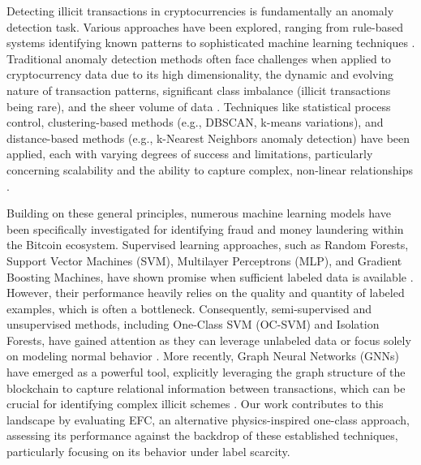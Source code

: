 \documentclass[12pt]{article}
\begin{document}
Detecting illicit transactions in cryptocurrencies is fundamentally an anomaly detection task. Various approaches have been 
explored, ranging from rule-based systems identifying known patterns to sophisticated machine learning techniques \cite{samariya2023comprehensive, li2023survey}.
Traditional anomaly detection methods often face challenges when applied to cryptocurrency data due to its high dimensionality,
the dynamic and evolving nature of transaction patterns, significant class imbalance (illicit transactions being rare), and
the sheer volume of data \cite{pallathadka2022cryptocurrency}. Techniques like statistical process control,
clustering-based methods (e.g., DBSCAN, k-means variations), and distance-based methods (e.g., k-Nearest Neighbors anomaly detection)
have been applied, each with varying degrees of success and limitations, particularly concerning scalability and the ability
to capture complex, non-linear relationships \cite{hilal2022financial}.

Building on these general principles, numerous machine learning models have been specifically investigated for identifying
fraud and money laundering within the Bitcoin ecosystem. Supervised learning approaches, such as Random Forests, Support
Vector Machines (SVM), Multilayer Perceptrons (MLP), and Gradient Boosting Machines, have shown promise when sufficient
labeled data is available \cite{lorenz2021machinelearningmethodsdetect, placeholder_supervised_ml_bitcoin}. However,
their performance heavily relies on the quality and quantity of labeled examples, which is often a bottleneck. Consequently,
semi-supervised and unsupervised methods, including One-Class SVM (OC-SVM) and Isolation Forests, have gained attention
as they can leverage unlabeled data or focus solely on modeling normal behavior \cite{lorenz2021machinelearningmethodsdetect, placeholder_unsupervised_ml_bitcoin}.
More recently, Graph Neural Networks (GNNs) have emerged as a powerful tool, explicitly leveraging the graph structure of
the blockchain to capture relational information between transactions, which can be crucial for identifying complex illicit
schemes \cite{weber2019antimoneylaunderingbitcoinexperimenting}. Our work contributes to this
landscape by evaluating EFC, an alternative physics-inspired one-class approach, assessing its performance against the
backdrop of these established techniques, particularly focusing on its behavior under label scarcity.
\end{document}
